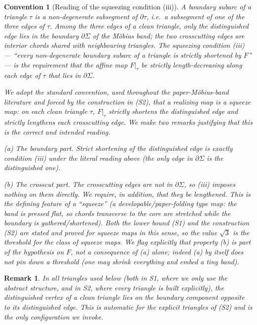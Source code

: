 \documentclass[12pt]{article}
\newtheorem{convention}[theorem]{Convention}
\newtheorem{remark}[theorem]{Remark}
\newcommand{\Sig}{\Sigma}
\begin{document}
\begin{convention}[Reading of the squeezing condition (iii)]
\label{conv:squeeze}
A \emph{boundary subarc of a triangle} $\tau$ is a non-degenerate
subsegment of $\partial\tau$, i.e.\ a subsegment of one of the three
edges of $\tau$. Among the three edges of a clean triangle, only the
distinguished edge lies in the boundary $\partial\Sig$ of the M\"obius
band; the two crosscutting edges are interior chords shared with
neighbouring triangles. The squeezing condition (iii) ---
``\emph{every non-degenerate boundary subarc of a triangle is strictly
shortened by $F$}'' --- is the requirement that the affine map
$F|_\tau$ be \emph{strictly length-decreasing along each edge of} $\tau$
\emph{that lies in} $\partial\Sig$.

We adopt the standard convention, used throughout the paper-M\"obius-band
literature and forced by the construction in (S2), that a realizing map
is a \emph{squeeze map}: on each clean triangle $\tau$, $F|_\tau$
\emph{strictly shortens the distinguished edge and strictly lengthens
each crosscutting edge}. We make two remarks justifying that this is the
correct and intended reading.

\smallskip
\emph{(a) The boundary part.} Strict shortening of the distinguished edge
is exactly condition (iii) under the literal reading above (the only
edge in $\partial\Sig$ is the distinguished one).

\smallskip
\emph{(b) The crosscut part.} The crosscutting edges are not in
$\partial\Sig$, so (iii) imposes nothing on them directly. We require, in
addition, that they be lengthened. This is the defining feature of a
``squeeze'' (a developable/paper-folding type map: the band is pressed
flat, so chords transverse to the core are stretched while the boundary
is gathered/shortened). Both the lower bound (S1) and the construction
(S2) are stated and proved for squeeze maps in this sense, so the value
$\sqrt3$ is the threshold for the class of squeeze maps. We flag
explicitly that property (b) is part of the hypothesis on $F$, not a
consequence of (a) alone; indeed (a) by itself does not pin down a
threshold (one may shrink everything and embed a tiny band).
\end{convention}

\begin{remark}\label{rem:clean}
In all triangles used below (both in S1, where we only use the abstract
structure, and in S2, where every triangle is built explicitly), the
distinguished vertex of a clean triangle lies on the boundary component
opposite to its distinguished edge. This is automatic for the explicit
triangles of (S2) and is the only configuration we invoke.
\end{remark}
\end{document}
